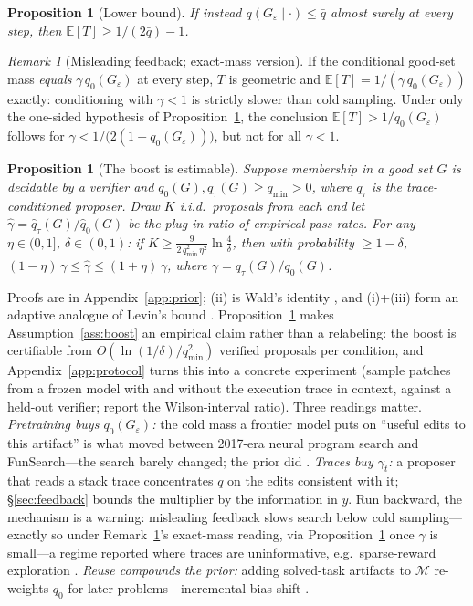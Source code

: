 \documentclass{article}
\theoremstyle{plain}
\newtheorem{proposition}[theorem]{Proposition}
\theoremstyle{definition}
\theoremstyle{remark}
\newtheorem{remark}[theorem]{Remark}
\newcommand{\M}{\mathcal{M}}
\newcommand{\E}{\mathbb{E}}
\newcommand{\eps}{\varepsilon}
\begin{document}
\begin{proposition}[Lower bound]
\label{prop:hitlower}
If instead $q(G_\eps \mid \cdot) \le \bar{q}$ almost surely at every step, then $\E[T] \ge 1/(2\bar{q}) - 1$.
\end{proposition}

\begin{remark}[Misleading feedback; exact-mass version]
\label{rem:misleading}
If the conditional good-set mass \emph{equals} $\gamma\, q_0(G_\eps)$ at every step, $T$ is geometric and $\E[T] = 1/(\gamma\, q_0(G_\eps))$ exactly: conditioning with $\gamma < 1$ is strictly slower than cold sampling. Under only the one-sided hypothesis of Proposition~\ref{prop:hitlower}, the conclusion $\E[T] > 1/q_0(G_\eps)$ follows for $\gamma < 1/\big(2(1 + q_0(G_\eps))\big)$, but not for all $\gamma < 1$.
\end{remark}

\begin{proposition}[The boost is estimable]
\label{prop:gammaest}
Suppose membership in a good set $G$ is decidable by a verifier and $q_0(G), q_\tau(G) \ge q_{\min} > 0$, where $q_\tau$ is the trace-conditioned proposer. Draw $K$ i.i.d.\ proposals from each and let $\hat\gamma = \hat{q}_\tau(G)/\hat{q}_0(G)$ be the plug-in ratio of empirical pass rates. For any $\eta \in (0,1]$, $\delta \in (0,1)$: if $K \ge \tfrac{9}{2\, q_{\min}^2\, \eta^2} \ln \tfrac{4}{\delta}$, then with probability $\ge 1-\delta$, $(1-\eta)\,\gamma \le \hat\gamma \le (1+\eta)\,\gamma$, where $\gamma = q_\tau(G)/q_0(G)$.
\end{proposition}

Proofs are in Appendix~\ref{app:prior}; (ii) is Wald's identity \citep{wald1944cumulative}, and (i)+(iii) form an adaptive analogue of Levin's bound \citep{levin1973universal}. Proposition~\ref{prop:gammaest} makes Assumption~\ref{ass:boost} an empirical claim rather than a relabeling: the boost is certifiable from $O(\ln(1/\delta)/q_{\min}^2)$ verified proposals per condition, and Appendix~\ref{app:protocol} turns this into a concrete experiment (sample patches from a frozen model with and without the execution trace in context, against a held-out verifier; report the Wilson-interval ratio). Three readings matter. \emph{Pretraining buys $q_0(G_\eps)$:} the cold mass a frontier model puts on ``useful edits to this artifact'' is what moved between 2017-era neural program search \citep{zoph2017nas} and FunSearch---the search barely changed; the prior did \citep[cf.][]{achille2025universal}. \emph{Traces buy $\gamma_t$:} a proposer that reads a stack trace concentrates $q$ on the edits consistent with it; \S\ref{sec:feedback} bounds the multiplier by the information in $y$. Run backward, the mechanism is a warning: misleading feedback slows search below cold sampling---exactly so under Remark~\ref{rem:misleading}'s exact-mass reading, via Proposition~\ref{prop:hitlower} once $\gamma$ is small---a regime reported where traces are uninformative, e.g.\ sparse-reward exploration \citep{weng2026hl}. \emph{Reuse compounds the prior:} adding solved-task artifacts to $\M$ re-weights $q_0$ for later problems---incremental bias shift \citep{schmidhuber1997shifting}.
\end{document}
